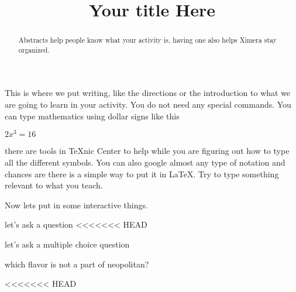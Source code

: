 \documentclass{ximera}%
\title{Your title Here}%
\begin{document}
\begin{abstract}
Abstracts help people know what your activity is, having one also helps Ximera stay organized.
\end{abstract}
\maketitle %
This is where we put writing, like the directions or the introduction to what we are going to learn in your activity. You do not need any special commands. You can type mathematics using dollar signs like this
 
$2x^3=16$

there are tools in TeXnic Center to help while you are figuring out how to type all the different symbols. You can also google almost any type of notation and chances are there is a simple way to put it in LaTeX. Try to type something relevant to what you teach.

Now lets put in some interactive things.

let's ask a question
<<<<<<< HEAD

let's ask a multiple choice question
\begin{question} which flavor is not a part of neopolitan?
\begin{multipleChoice}
\end{multipleChoice}
\end{question}
<<<<<<< HEAD
\end{document}

